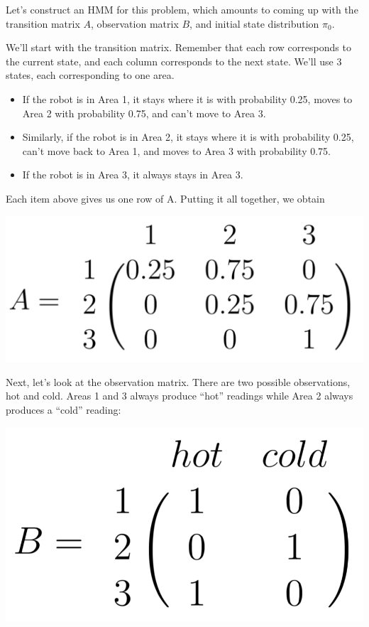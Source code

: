 \documentclass[6008notes.tex]{subfiles}
\begin{document}
Let's construct an HMM for this problem, which amounts to coming up with the transition matrix $A$, observation matrix $B$, and initial state distribution $\pi_0$.

We'll start with the transition matrix. Remember that each row corresponds to the current state, and each column corresponds to the next state. We'll use 3 states, each corresponding to one area.

\begin{itemize}
\item If the robot is in Area 1, it stays where it is with probability 0.25, moves to Area 2 with probability 0.75, and can't move to Area 3.

\item Similarly, if the robot is in Area 2, it stays where it is with probability 0.25, can't move back to Area 1, and moves to Area 3 with probability 0.75.

\item If the robot is in Area 3, it always stays in Area 3.
\end{itemize}

Each item above gives us one row of A. Putting it all together, we obtain

{\centering\includegraphics[scale=0.25]{images_sec-formulating-hmm-helper1} \par}

Next, let's look at the observation matrix. There are two possible observations, hot and cold. Areas 1 and 3 always produce ``hot'' readings while Area 2 always produces a ``cold'' reading:

{\centering\includegraphics[scale=0.25]{images_sec-formulating-hmm-helper2} \par}
\end{document}
